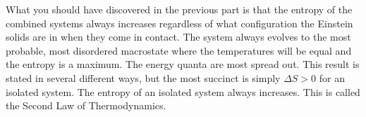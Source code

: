 What you should have discovered in the previous part is that the entropy of the combined systems
always increases regardless of what configuration the Einstein solids are in when they
come in contact.
The system always evolves to the most probable, most disordered
 macrostate where the temperatures will
be equal and the entropy is a maximum.
The energy quanta are most spread out.
This result is stated in several different ways, but the most succinct is simply
$\Delta S > 0$ for an isolated system.
The entropy of an isolated system always increases.
This is called the Second Law of Thermodynamics.

\bigskip


 






